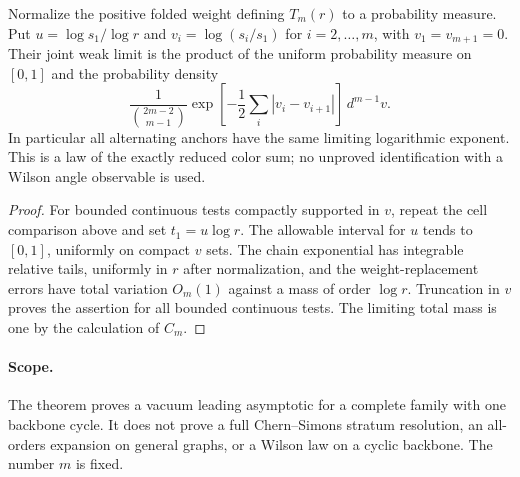 \begin{corollary}
Normalize the positive folded weight defining $T_m(r)$ to a
probability measure. Put $u=\log s_1/\log r$ and
$v_i=\log(s_i/s_1)$ for $i=2,\ldots,m$, with $v_1=v_{m+1}=0$.
Their joint weak limit is the product of the uniform probability
measure on $[0,1]$ and the probability density
\[
 \frac{1}{\binom{2m-2}{m-1}}
 \exp\left[-\frac12\sum_i|v_i-v_{i+1}|\right]\,d^{m-1}v.
\]
In particular all alternating anchors have the same limiting
logarithmic exponent. This is a law of the exactly reduced color
sum; no unproved identification with a Wilson angle observable is
used.
\end{corollary}
\begin{proof}
For bounded continuous tests compactly supported in $v$, repeat
the cell comparison above and set $t_1=u\log r$. The allowable
interval for $u$ tends to $[0,1]$, uniformly on compact $v$ sets.
The chain exponential has integrable relative tails, uniformly in
$r$ after normalization, and the weight-replacement errors have
total variation $O_m(1)$ against a mass of order $\log r$.
Truncation in $v$ proves the assertion for all bounded continuous
tests. The limiting total mass is one by the calculation of $C_m$.
\end{proof}

\paragraph{Scope.}
The theorem proves a vacuum leading asymptotic for a complete family
with one backbone cycle. It does not prove a full Chern--Simons
stratum resolution, an all-orders expansion on general graphs, or
a Wilson law on a cyclic backbone. The number $m$ is fixed.
